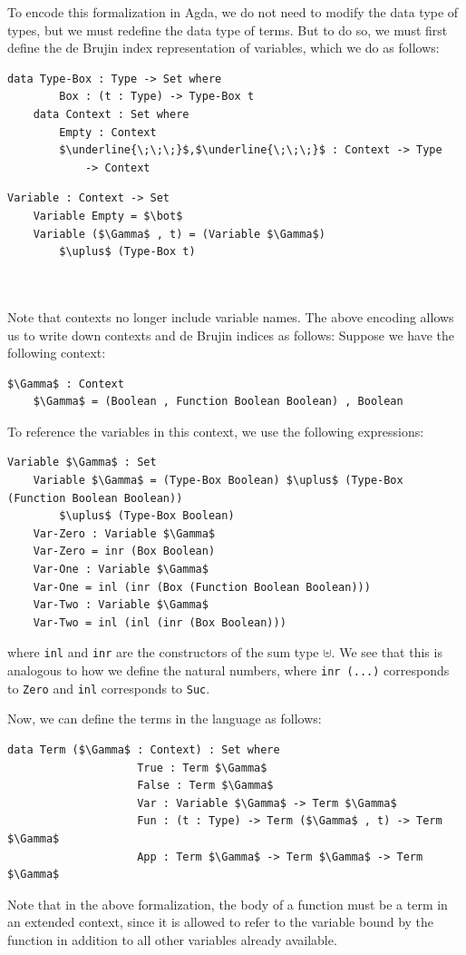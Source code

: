 \documentclass[12pt, letterpaper]{article}
\begin{document}
To encode this formalization in Agda, we do not need to modify the data type of types, but we must redefine the data type of terms. But to do so, we must first define the de Brujin index representation of variables, which we do as follows:
\begin{multicols}{2}
\begin{Verbatim}[mathescape,commandchars=\\\{\}]
	data Type-Box : Type -> Set where
		Box : (t : Type) -> Type-Box t
	data Context : Set where
		Empty : Context
		$\underline{\;\;\;}$,$\underline{\;\;\;}$ : Context -> Type 
			-> Context
\end{Verbatim}
\begin{Verbatim}[mathescape,commandchars=\\\{\}]
	Variable : Context -> Set
	Variable Empty = $\bot$
	Variable ($\Gamma$ , t) = (Variable $\Gamma$) 
		$\uplus$ (Type-Box t)
		
		
\end{Verbatim}
\end{multicols}
Note that contexts no longer include variable names. The above encoding allows us to write down contexts and de Brujin indices as follows: Suppose we have the following context:
\begin{Verbatim}[mathescape,commandchars=\\\{\}]
	$\Gamma$ : Context
	$\Gamma$ = (Boolean , Function Boolean Boolean) , Boolean
\end{Verbatim}
\begin{flushleft}
To reference the variables in this context, we use the following expressions:
\begin{Verbatim}[mathescape,commandchars=\\\{\}]
	Variable $\Gamma$ : Set
	Variable $\Gamma$ = (Type-Box Boolean) $\uplus$ (Type-Box (Function Boolean Boolean)) 
		$\uplus$ (Type-Box Boolean)
	Var-Zero : Variable $\Gamma$
	Var-Zero = inr (Box Boolean)
	Var-One : Variable $\Gamma$
	Var-One = inl (inr (Box (Function Boolean Boolean)))
	Var-Two : Variable $\Gamma$
	Var-Two = inl (inl (inr (Box Boolean)))
\end{Verbatim}
where \texttt{inl} and \texttt{inr} are the constructors of the sum type $\uplus$. We see that this is analogous to how we define the natural numbers, where \texttt{inr (...)} corresponds to \texttt{Zero} and \texttt{inl} corresponds to \texttt{Suc}.
\end{flushleft}

Now, we can define the terms in the language as follows:
\begin{Verbatim}[mathescape,commandchars=\\\{\}]
				data Term ($\Gamma$ : Context) : Set where
					True : Term $\Gamma$
					False : Term $\Gamma$
					Var : Variable $\Gamma$ -> Term $\Gamma$
					Fun : (t : Type) -> Term ($\Gamma$ , t) -> Term $\Gamma$
					App : Term $\Gamma$ -> Term $\Gamma$ -> Term $\Gamma$
\end{Verbatim}
Note that in the above formalization, the body of a function must be a term in an extended context, since it is allowed to refer to the variable bound by the function in addition to all other variables already available. 
\end{document}
